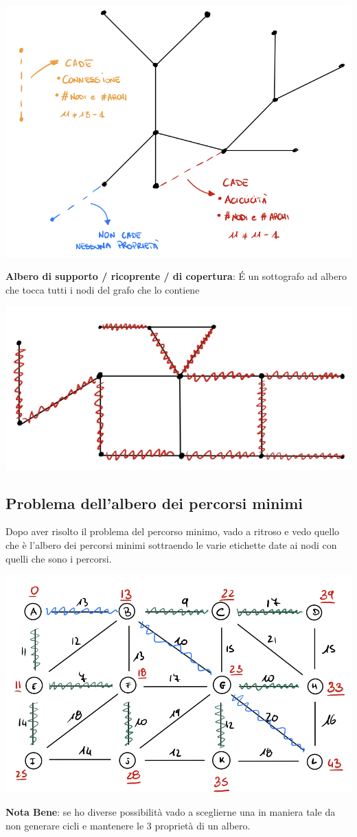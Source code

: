 \documentclass[12pt,a4paper]{article}
\begin{document}
\begin{center}
\includegraphics[width=0.5\columnwidth]{img/albero.jpg}\\
\end{center}
\textbf{Albero di supporto / ricoprente / di copertura}: \'E un sottografo ad albero che tocca tutti i nodi del grafo che lo contiene
\begin{center}
\includegraphics[width=0.4\columnwidth]{img/albero_ric.jpg}\\
\end{center}

\subsection{Problema dell'albero dei percorsi minimi}
Dopo aver risolto il problema del percorso minimo, vado a ritroso e vedo quello che è l'albero dei percorsi minimi sottraendo le varie etichette date ai nodi con quelli che sono i percorsi.\\
\begin{center}
\includegraphics[width=0.6\columnwidth]{img/albero_perc_min.jpeg}
\end{center}
\textbf{Nota Bene}: se ho diverse possibilità vado a sceglierne una in maniera tale da non generare cicli e mantenere le 3 proprietà di un albero.
\end{document}

